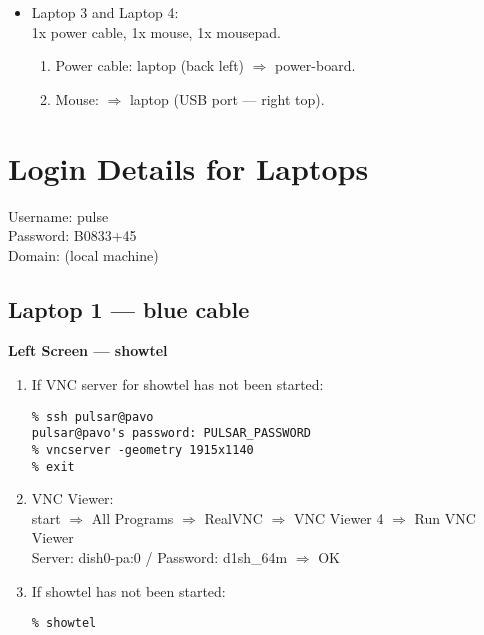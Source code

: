 \documentclass{article}
\begin{document}
\begin{itemize}
\item Laptop 3 and Laptop 4: \\
1x power cable, 1x mouse, 1x mousepad.
\begin{enumerate}
\item Power cable: laptop (back left) $\Rightarrow$ power-board.
\item Mouse: $\Rightarrow$ laptop (USB port --- right top).
\end{enumerate}

\end{itemize}

\section{Login Details for Laptops}
Username: pulse \\
Password: B0833+45 \\
Domain: (local machine) \\

\subsection*{Laptop 1 --- blue cable}
\textbf{Left Screen --- showtel}
\begin{enumerate}
\item If VNC server for showtel has not been started:
\begin{verbatim}
% ssh pulsar@pavo
pulsar@pavo's password: PULSAR_PASSWORD
% vncserver -geometry 1915x1140
% exit
\end{verbatim}

\item VNC Viewer: \\
start $\Rightarrow$ All Programs $\Rightarrow$ RealVNC $\Rightarrow$ VNC Viewer 4 $\Rightarrow$ Run VNC Viewer \\

Server: dish0-pa:0 / Password: d1sh\_64m $\Rightarrow$ OK

\item If showtel has not been started:
\begin{verbatim}
% showtel
\end{verbatim}

\end{enumerate}
\end{document}
